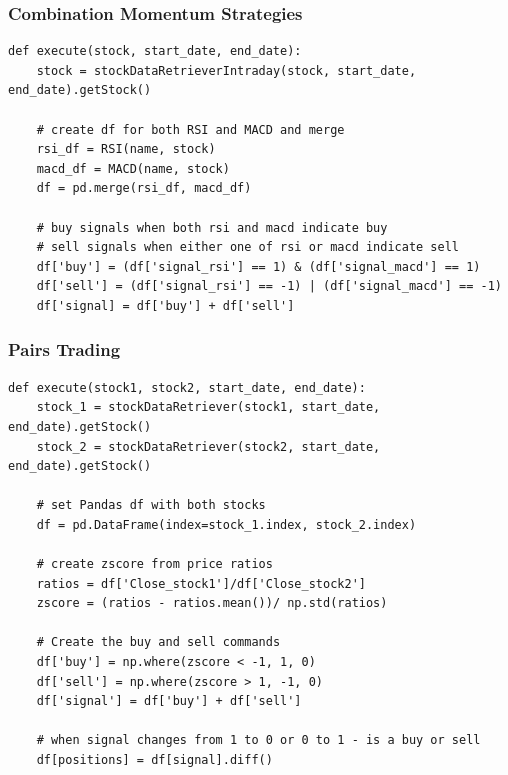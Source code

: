 \documentclass[letterpaper,11pt]{article}
\begin{document}
\subsubsection{Combination Momentum Strategies }

\begin{verbatim}
def execute(stock, start_date, end_date):
    stock = stockDataRetrieverIntraday(stock, start_date, end_date).getStock()
	
    # create df for both RSI and MACD and merge
    rsi_df = RSI(name, stock)
    macd_df = MACD(name, stock)
    df = pd.merge(rsi_df, macd_df)
    
    # buy signals when both rsi and macd indicate buy
    # sell signals when either one of rsi or macd indicate sell
    df['buy'] = (df['signal_rsi'] == 1) & (df['signal_macd'] == 1)
    df['sell'] = (df['signal_rsi'] == -1) | (df['signal_macd'] == -1)
    df['signal] = df['buy'] + df['sell']

\end{verbatim}

\subsubsection{Pairs Trading}

\begin{verbatim}
def execute(stock1, stock2, start_date, end_date):
    stock_1 = stockDataRetriever(stock1, start_date, end_date).getStock()
    stock_2 = stockDataRetriever(stock2, start_date, end_date).getStock()

    # set Pandas df with both stocks
    df = pd.DataFrame(index=stock_1.index, stock_2.index)

    # create zscore from price ratios
    ratios = df['Close_stock1']/df['Close_stock2']
    zscore = (ratios - ratios.mean())/ np.std(ratios)

    # Create the buy and sell commands
    df['buy'] = np.where(zscore < -1, 1, 0)
    df['sell'] = np.where(zscore > 1, -1, 0)
    df['signal'] = df['buy'] + df['sell']

    # when signal changes from 1 to 0 or 0 to 1 - is a buy or sell
    df[positions] = df[signal].diff()

\end{verbatim}


\nocite{*}

\end{document}
